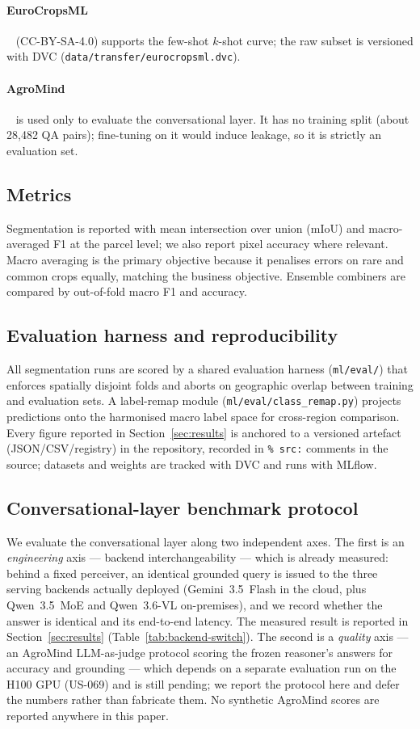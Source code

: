 \paragraph{EuroCropsML}~\cite{reuss2025eurocropsml} (CC-BY-SA-4.0)
supports the few-shot $k$-shot curve; the raw subset is versioned with
DVC (\texttt{data/transfer/eurocropsml.dvc}).

\paragraph{AgroMind}~\cite{ruan2025agromind} is used only to evaluate
the conversational layer. It has no training split (about 28{,}482 QA
pairs); fine-tuning on it would induce leakage, so it is strictly an
evaluation set.

\subsection{Metrics}
Segmentation is reported with mean intersection over union (mIoU) and
macro-averaged F1 at the parcel level; we also report pixel accuracy
where relevant. Macro averaging is the primary objective because it
penalises errors on rare and common crops equally, matching the
business objective. Ensemble combiners are compared by out-of-fold
macro F1 and accuracy.

\subsection{Evaluation harness and reproducibility}
All segmentation runs are scored by a shared evaluation harness
(\texttt{ml/eval/}) that enforces spatially disjoint folds and aborts on
geographic overlap between training and evaluation sets. A label-remap
module (\texttt{ml/eval/class\_remap.py}) projects predictions onto the
harmonised macro label space for cross-region comparison. Every figure
reported in Section~\ref{sec:results} is anchored to a versioned
artefact (JSON/CSV/registry) in the repository, recorded in
\texttt{\% src:} comments in the source; datasets and weights are
tracked with DVC and runs with MLflow.

\subsection{Conversational-layer benchmark protocol}
\label{sec:experiments-llm}
We evaluate the conversational layer along two independent axes. The
first is an \emph{engineering} axis --- backend interchangeability ---
which is already measured: behind a fixed perceiver, an identical
grounded query is issued to the three serving backends actually deployed
(Gemini~3.5~Flash in the cloud, plus Qwen~3.5~MoE and Qwen~3.6-VL
on-premises), and we record whether the answer is identical and its
end-to-end latency. The measured result is reported in
Section~\ref{sec:results} (Table~\ref{tab:backend-switch}). The second
is a \emph{quality} axis --- an AgroMind LLM-as-judge protocol scoring the
frozen reasoner's answers for accuracy and grounding --- which depends on
a separate evaluation run on the H100 GPU (US-069) and is still pending;
we report the protocol here and defer the numbers rather than fabricate
them. No synthetic AgroMind scores are reported anywhere in this paper.
